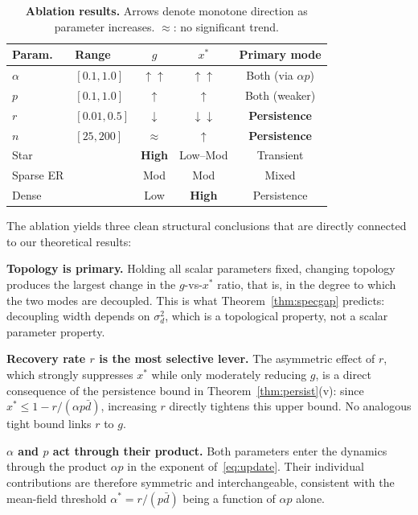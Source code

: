 \documentclass[10pt,twocolumn]{article}
\theoremstyle{myproof}
\newcommand{\xst}{x^*}
\begin{document}
\begin{table}[H]
\centering
\caption{\textbf{Ablation results.} Arrows denote monotone direction as parameter increases.
$\approx$: no significant trend.}
\label{tab:ablation}
\small\setlength{\tabcolsep}{3.5pt}
\begin{tabular}{@{}llccc@{}}
\toprule
\textbf{Param.}&\textbf{Range}&\textbf{$g$}&\textbf{$\xst$}&\textbf{Primary mode}\\
\midrule
\rowcolor{tabblue}$\alpha$&$[0.1,1.0]$&$\uparrow\uparrow$&$\uparrow\uparrow$&Both (via $\alpha p$)\\
$p$&$[0.1,1.0]$&$\uparrow$&$\uparrow$&Both (weaker)\\
\rowcolor{tabblue}$r$&$[0.01,0.5]$&$\downarrow$&$\downarrow\downarrow$&\textbf{Persistence}\\
$n$&$[25,200]$&$\approx$&$\uparrow$&\textbf{Persistence}\\
\midrule
Star&&\textbf{High}&Low--Mod&Transient\\
\rowcolor{tabblue}Sparse ER&&Mod&Mod&Mixed\\
Dense&&Low&\textbf{High}&Persistence\\
\bottomrule
\end{tabular}
\end{table}

The ablation yields three clean structural conclusions that are directly connected to our
theoretical results:

\textbf{Topology is primary.} Holding all scalar parameters fixed, changing topology produces
the largest change in the $g$-vs-$\xst$ ratio, that is, in the degree to which the two modes are
decoupled. This is what Theorem~\ref{thm:specgap} predicts: decoupling width depends on
$\sigma^2_d$, which is a topological property, not a scalar parameter property.

\textbf{Recovery rate $r$ is the most selective lever.} The asymmetric effect of $r$, which strongly
suppresses $\xst$ while only moderately reducing $g$, is a direct consequence of the
persistence bound in Theorem~\ref{thm:persist}(v): since $\xst\leq 1-r/(\alpha p\bar{d})$,
increasing $r$ directly tightens this upper bound. No analogous tight bound links $r$ to $g$.

\textbf{$\alpha$ and $p$ act through their product.} Both parameters enter the dynamics through
the product $\alpha p$ in the exponent of~\eqref{eq:update}. Their individual contributions are
therefore symmetric and interchangeable, consistent with the mean-field threshold $\alpha^*=r/(p\bar{d})$
being a function of $\alpha p$ alone.
\end{document}
